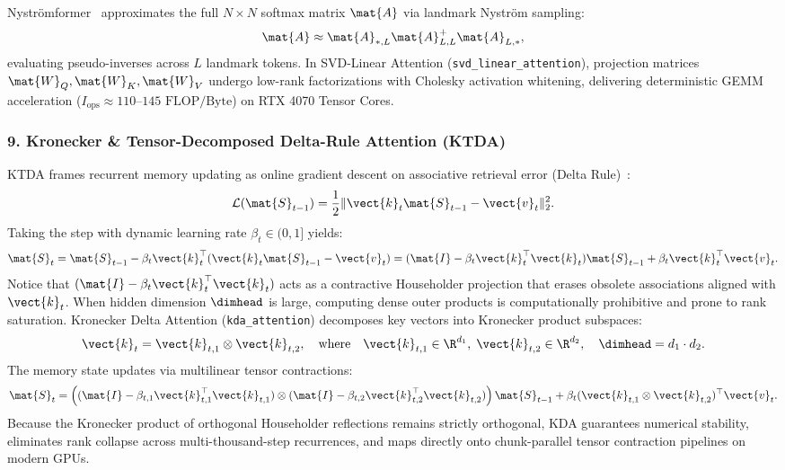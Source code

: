 Nyströmformer~\cite{xiong2021nystromformer} approximates the full $N \times N$ softmax matrix $\mat{A}$ via landmark Nyström sampling:
\begin{equation}
\mat{A} \approx \mat{A}_{*, L} \mat{A}_{L, L}^+ \mat{A}_{L, *},
\end{equation}
evaluating pseudo-inverses across $L$ landmark tokens. In SVD-Linear Attention (\texttt{svd\_linear\_attention}), projection matrices $\mat{W}_Q, \mat{W}_K, \mat{W}_V$ undergo low-rank factorizations with Cholesky activation whitening, delivering deterministic GEMM acceleration ($I_{\text{ops}} \approx 110\text{--}145\text{ FLOP/Byte}$) on RTX 4070 Tensor Cores.

\subsubsection{9. Kronecker \& Tensor-Decomposed Delta-Rule Attention (KTDA)}
\label{subsubsec:ktda_contract}
KTDA frames recurrent memory updating as online gradient descent on associative retrieval error (Delta Rule)~\cite{schlag2021deltanet}:
\begin{equation}
\mathcal{L}(\mat{S}_{t-1}) = \frac{1}{2} \|\vect{k}_t \mat{S}_{t-1} - \vect{v}_t\|_2^2.
\end{equation}
Taking the step with dynamic learning rate $\beta_t \in (0, 1]$ yields:
\begin{equation}
\mat{S}_t = \mat{S}_{t-1} - \beta_t \vect{k}_t^\top (\vect{k}_t \mat{S}_{t-1} - \vect{v}_t) = (\mat{I} - \beta_t \vect{k}_t^\top \vect{k}_t) \mat{S}_{t-1} + \beta_t \vect{k}_t^\top \vect{v}_t.
\label{eq:delta_rule_householder}
\end{equation}
Notice that $(\mat{I} - \beta_t \vect{k}_t^\top \vect{k}_t)$ acts as a contractive Householder projection that erases obsolete associations aligned with $\vect{k}_t$. When hidden dimension $\dimhead$ is large, computing dense outer products is computationally prohibitive and prone to rank saturation. Kronecker Delta Attention (\texttt{kda\_attention}) decomposes key vectors into Kronecker product subspaces:
\begin{equation}
\vect{k}_t = \vect{k}_{t, 1} \otimes \vect{k}_{t, 2}, \quad \text{where} \quad \vect{k}_{t, 1} \in \R^{d_1}, \; \vect{k}_{t, 2} \in \R^{d_2}, \quad \dimhead = d_1 \cdot d_2.
\end{equation}
The memory state updates via multilinear tensor contractions:
\begin{equation}
\mat{S}_t = \left( (\mat{I} - \beta_{t, 1} \vect{k}_{t, 1}^\top \vect{k}_{t, 1}) \otimes (\mat{I} - \beta_{t, 2} \vect{k}_{t, 2}^\top \vect{k}_{t, 2}) \right) \mat{S}_{t-1} + \beta_t (\vect{k}_{t, 1} \otimes \vect{k}_{t, 2})^\top \vect{v}_t.
\end{equation}
Because the Kronecker product of orthogonal Householder reflections remains strictly orthogonal, KDA guarantees numerical stability, eliminates rank collapse across multi-thousand-step recurrences, and maps directly onto chunk-parallel tensor contraction pipelines on modern GPUs.


